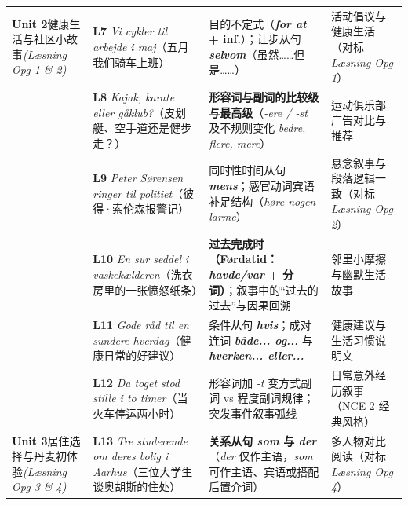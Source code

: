 \documentclass[10.5pt, a4paper]{ctexart}
\begin{document}
{\begin{longtable}{@{} >{\raggedright\arraybackslash}p{2.65cm} >{\raggedright\arraybackslash}p{4.6cm} >{\raggedright\arraybackslash}p{5.15cm} >{\raggedright\arraybackslash}p{3.2cm} @{}}
\midrule
\textbf{Unit 2}\newline 健康生活与\newline 社区小故事\newline \textit{(Læsning Opg 1 \& 2)} & \textbf{L7} \textit{Vi cykler til arbejde i maj}\newline （五月我们骑车上班） & 目的不定式（\textbf{\textit{for at} + inf.}）；让步从句 \textbf{\textit{selvom}}（虽然……但是……） & 活动倡议与健康生活（对标 \textit{Læsning Opg 1}） \\
 & \textbf{L8} \textit{Kajak, karate eller gåklub?}\newline （皮划艇、空手道还是健步走？） & \textbf{形容词与副词的比较级与最高级}（\textit{-ere / -st} 及不规则变化 \textit{bedre, flere, mere}） & 运动俱乐部广告对比与推荐 \\
 & \textbf{L9} \textit{Peter Sørensen ringer til politiet}\newline （彼得·索伦森报警记） & 同时性时间从句 \textbf{\textit{mens}}；感官动词宾语补足结构（\textit{høre nogen larme}） & 悬念叙事与段落逻辑一致（对标 \textit{Læsning Opg 2}） \\
 & \textbf{L10} \textit{En sur seddel i vaskekælderen}\newline （洗衣房里的一张愤怒纸条） & \textbf{过去完成时（Førdatid：\textit{havde/var} + 分词）}；叙事中的“过去的过去”与因果回溯 & 邻里小摩擦与幽默生活故事 \\
 & \textbf{L11} \textit{Gode råd til en sundere hverdag}\newline （健康日常的好建议） & 条件从句 \textbf{\textit{hvis}}；成对连词 \textbf{\textit{både... og...}} 与 \textbf{\textit{hverken... eller...}} & 健康建议与生活习惯说明文 \\
 & \textbf{L12} \textit{Da toget stod stille i to timer}\newline （当火车停运两小时） & 形容词加 \textit{-t} 变方式副词 vs 程度副词规律；突发事件叙事弧线 & 日常意外经历叙事（NCE 2 经典风格） \\
\midrule
\textbf{Unit 3}\newline 居住选择与\newline 丹麦初体验\newline \textit{(Læsning Opg 3 \& 4)} & \textbf{L13} \textit{Tre studerende om deres bolig i Aarhus}\newline （三位大学生谈奥胡斯的住处） & \textbf{关系从句 \textit{som} 与 \textit{der}}（\textit{der} 仅作主语，\textit{som} 可作主语、宾语或搭配后置介词） & 多人物对比阅读（对标 \textit{Læsning Opg 4}） \\

\end{longtable}}
\end{document}
